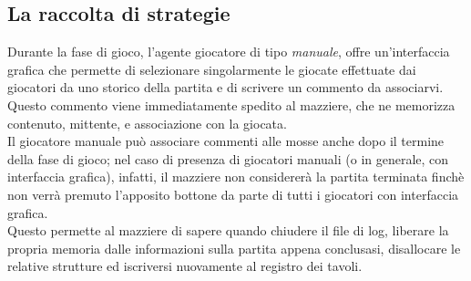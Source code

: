 \subsection{La raccolta di strategie}
Durante la fase di gioco, l'agente giocatore di tipo \emph{manuale}, offre un'interfaccia grafica che permette di selezionare singolarmente le giocate effettuate dai giocatori da uno storico della partita e di scrivere un commento da associarvi.
Questo commento viene immediatamente spedito al mazziere, che ne memorizza contenuto, mittente, e associazione con la giocata.\\
Il giocatore manuale può associare commenti alle mosse anche dopo il termine della fase di gioco; nel caso di presenza di giocatori manuali (o in generale, con interfaccia grafica), infatti, il mazziere non considererà la partita terminata finchè non verrà premuto l'apposito bottone da parte di tutti i giocatori con interfaccia grafica.\\
Questo permette al mazziere di sapere quando chiudere il file di log, liberare la propria memoria dalle informazioni sulla partita appena conclusasi, disallocare le relative strutture ed iscriversi nuovamente al registro dei tavoli.
